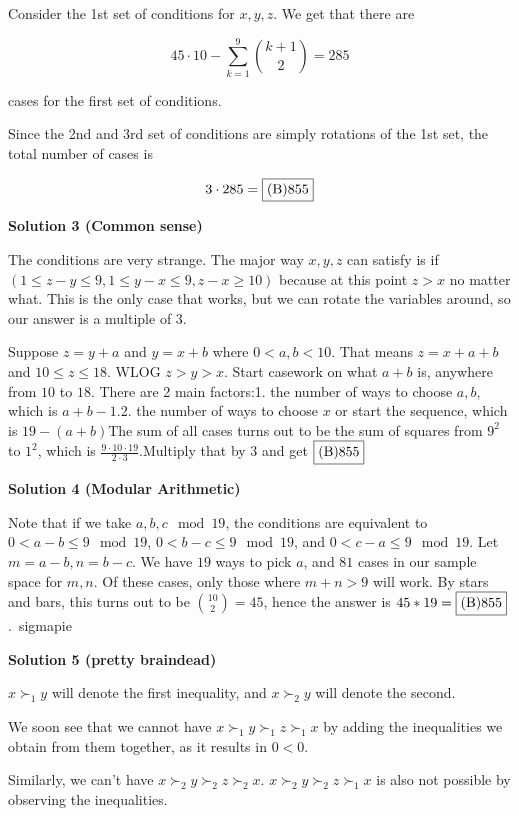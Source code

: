 \begin{enumerate}
 Consider the 1st set of conditions for $x, y, z$. We get that there are

 
 \[45\cdot 10 - \sum_{k=1}^{9} \binom{k+1}{2} = 285\]

 cases for the first set of conditions.

 Since the 2nd and 3rd set of conditions are simply rotations of the 1st set, the total number of cases is

 
 \[3\cdot 285 = \fbox{(B)855}\]




\textbf{Solution 3 (Common sense)}

The conditions are very strange. The major way $x,y,z$ can satisfy is if $(1 \leq z-y \leq 9 , 1 \leq y-x \leq 9 , z-x \geq 10)$ because at this point $z > x$ no matter what. This is the only case that works, but we can rotate the variables around, so our answer is a multiple of $3$.

 Suppose $z=y+a$ and $y=x+b$ where $0<a,b<10$. That means $z=x+a+b$ and $10 \leq z \leq 18$. WLOG $z>y>x$. Start casework on what $a+b$ is, anywhere from $10$ to $18$. There are 2 main factors:1. the number of ways to choose $a,b$, which is $a+b-1$.2. the number of ways to choose $x$ or start the sequence, which is $19-(a+b)$The sum of all cases turns out to be the sum of squares from $9^2$ to $1^2$, which is $\frac{9 \cdot 10 \cdot 19}{2 \cdot 3}$.Multiply that by $3$ and get $\fbox{(B)855}$




\textbf{Solution 4 (Modular Arithmetic)}

Note that if we take $a, b, c\mod{19}$, the conditions are equivalent to $0<a-b\le{9}\mod{19}$, $0<b-c\le{9}\mod{19}$, and $0<c-a\le{9}\mod{19}$. Let $m=a-b, n=b-c$. We have $19$ ways to pick $a$, and $81$ cases in our sample space for $m, n$. Of these cases, only those where $m+n>9$ will work. By stars and bars, this turns out to be $\binom{10}{2}=45$, hence the answer is $45*19=\fbox{(B)855}$.~sigmapie

 



\textbf{Solution 5 (pretty braindead)}

$x \succ_1 y$ will denote the first inequality, and $x\succ_2 y$ will denote the second.

 
We soon see that we cannot have $x\succ_1 y \succ_1 z \succ_1 x$ by adding the inequalities we obtain from them together, as it results in $0<0$.

 
Similarly, we can't have $x\succ_2 y \succ_2 z \succ_2 x$. $x\succ_2 y \succ_2 z \succ_1 x$ is also not possible by observing the inequalities.


\end{enumerate}
